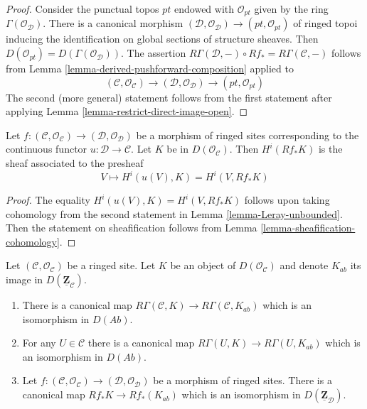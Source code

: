 \begin{proof}
Consider the punctual topos $pt$ endowed with $\mathcal{O}_{pt}$
given by the ring $\Gamma(\mathcal{O}_\mathcal{D})$.
There is a canonical morphism
$(\mathcal{D}, \mathcal{O}_\mathcal{D}) \to (pt, \mathcal{O}_{pt})$
of ringed topoi inducing the identification on global sections of
structure sheaves. Then
$D(\mathcal{O}_{pt}) = D(\Gamma(\mathcal{O}_\mathcal{D}))$.
The assertion
$R\Gamma(\mathcal{D}, -) \circ Rf_* = R\Gamma(\mathcal{C}, -)$
follows from Lemma \ref{lemma-derived-pushforward-composition}
applied to
$$
(\mathcal{C}, \mathcal{O}_\mathcal{C}) \to
(\mathcal{D}, \mathcal{O}_\mathcal{D}) \to (pt, \mathcal{O}_{pt})
$$
The second (more general) statement follows from the first statement
after applying Lemma \ref{lemma-restrict-direct-image-open}.
\end{proof}

\begin{lemma}
\label{lemma-unbounded-describe-higher-direct-images}
Let $f : (\mathcal{C}, \mathcal{O}_\mathcal{C}) \to
(\mathcal{D}, \mathcal{O}_\mathcal{D})$ be a morphism of ringed sites
corresponding to the continuous functor $u : \mathcal{D} \to \mathcal{C}$.
Let $K$ be in $D(\mathcal{O}_\mathcal{C})$. Then $H^i(Rf_*K)$ is the sheaf
associated to the presheaf
$$
V \mapsto H^i(u(V), K) = H^i(V, Rf_*K)
$$
\end{lemma}

\begin{proof}
The equality $H^i(u(V), K) = H^i(V, Rf_*K)$ follows upon taking
cohomology from the second statement in
Lemma \ref{lemma-Leray-unbounded}. Then the statement on sheafification
follows from Lemma \ref{lemma-sheafification-cohomology}.
\end{proof}

\begin{lemma}
\label{lemma-modules-abelian-unbounded}
Let $(\mathcal{C}, \mathcal{O}_\mathcal{C})$ be a ringed site.
Let $K$ be an object of $D(\mathcal{O}_\mathcal{C})$
and denote $K_{ab}$ its image in $D(\underline{\mathbf{Z}}_\mathcal{C})$.
\begin{enumerate}
\item There is a canonical map
$R\Gamma(\mathcal{C}, K) \to R\Gamma(\mathcal{C}, K_{ab})$
which is an isomorphism in $D(\textit{Ab})$.
\item For any $U \in \mathcal{C}$ there is a canonical map
$R\Gamma(U, K) \to R\Gamma(U, K_{ab})$
which is an isomorphism in $D(\textit{Ab})$.
\item Let $f : (\mathcal{C}, \mathcal{O}_\mathcal{C}) \to
(\mathcal{D}, \mathcal{O}_\mathcal{D})$ be a morphism of ringed sites.
There is a canonical map $Rf_*K \to Rf_*(K_{ab})$ which
is an isomorphism in $D(\underline{\mathbf{Z}}_\mathcal{D})$.
\end{enumerate}
\end{lemma}

